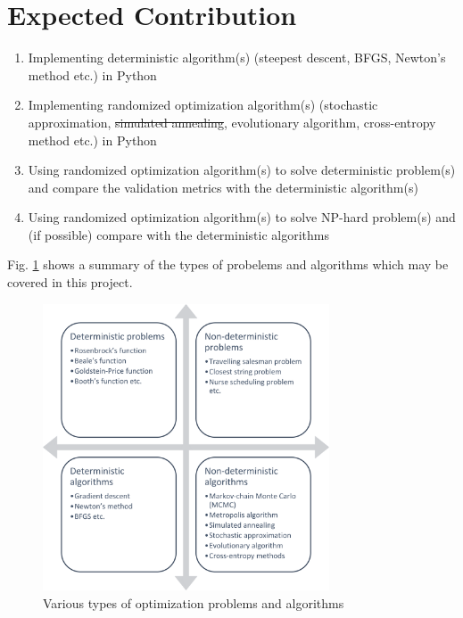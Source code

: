 \documentclass[conference]{IEEEtran}
\begin{document}
\section{Expected Contribution}

\begin{enumerate}
	\item{Implementing deterministic algorithm(s) (steepest descent, BFGS, Newton's method etc.) in Python}
	\item{Implementing randomized optimization algorithm(s) (stochastic approximation, \sout{simulated annealing}, evolutionary algorithm, cross-entropy method etc.) in Python}
	\item{Using randomized optimization algorithm(s) to solve deterministic problem(s) and compare the validation metrics with the deterministic algorithm(s)}
	\item{Using randomized optimization algorithm(s) to solve NP-hard problem(s) and (if possible) compare with the deterministic algorithms}
\end{enumerate}

Fig. \ref{fig} shows a summary of the types of probelems and algorithms which may be covered in this project.

\begin{figure}[tbp]
\centerline{\includegraphics[width=85mm]{flowchart.png}}
\caption{Various types of optimization problems and algorithms}
\label{fig}
\end{figure}

\end{document}
